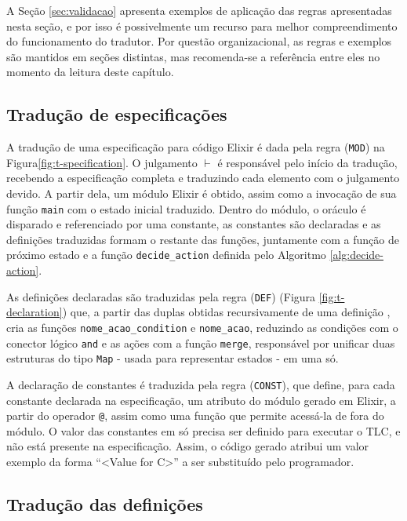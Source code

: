 A Seção \ref{sec:validacao} apresenta exemplos de aplicação das regras
apresentadas nesta seção, e por isso é possivelmente um recurso para melhor
compreendimento do funcionamento do tradutor. Por questão organizacional, as
regras e exemplos são mantidos em seções distintas, mas recomenda-se a
referência entre eles no momento da leitura deste capítulo.

\subsection{Tradução de especificações}



A tradução de uma especificação para código Elixir é dada pela regra
(\texttt{MOD}) na Figura\ref{fig:t-specification}.
O julgamento $\vdash$ é responsável pelo início da tradução, recebendo a
especificação completa e traduzindo cada elemento com o julgamento devido.
A partir dela, um módulo Elixir é obtido, assim como a invocação de sua
função \texttt{main} com o estado inicial traduzido. Dentro do módulo, o oráculo
é disparado e referenciado por uma constante, as constantes são declaradas e as
definições traduzidas formam o restante das funções, juntamente com a função de
próximo estado e a função \texttt{decide\_action} definida pelo Algoritmo \ref{alg:decide-action}.

As definições declaradas são traduzidas pela regra (\texttt{DEF}) (Figura
\ref{fig:t-declaration}) que, a partir das duplas
obtidas recursivamente de uma definição \FANCYA, cria as funções \texttt{nome\_acao\_condition} 
e \texttt{nome\_acao}, reduzindo as condições com o conector lógico \texttt{and}
e as ações com a função \texttt{merge}, responsável por unificar duas
estruturas do tipo \texttt{Map} - usada para representar estados - em uma só.

A declaração de constantes é traduzida pela regra (\texttt{CONST}), que define,
para cada constante declarada na especificação, um atributo do módulo gerado em
Elixir, a partir do operador \texttt{@}, assim como uma função que permite acessá-la de
fora do módulo. O valor das constantes em \TLA só precisa ser definido para
executar o TLC, e não está presente na especificação. Assim, o código gerado
atribui um valor exemplo da forma ``<Value for C>'' a ser substituído pelo programador.


\subsection{Tradução das definições}

